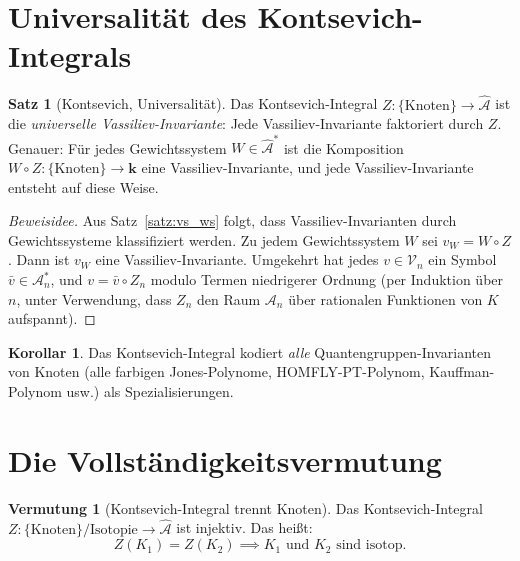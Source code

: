 \documentclass[12pt,a4paper]{amsart}
\theoremstyle{definition}
\newtheorem{satz}[theorem]{Satz}
\newtheorem{vermutung}[theorem]{Vermutung}
\newtheorem{korollar}[theorem]{Korollar}
\newcommand{\Ac}{\mathcal{A}}
\begin{document}
\section{Universalität des Kontsevich-Integrals}\label{sec:universalitaet}

\begin{satz}[Kontsevich, Universalität]\label{satz:universalitaet}
Das Kontsevich-Integral $Z: \{\text{Knoten}\} \to \hat{\mathcal{A}}$ ist
die \emph{universelle Vassiliev-Invariante}: Jede Vassiliev-Invariante
faktoriert durch $Z$.  Genauer: Für jedes Gewichtssystem $W \in \hat{\mathcal{A}}^*$
ist die Komposition $W \circ Z: \{\text{Knoten}\} \to \mathbf{k}$ eine
Vassiliev-Invariante, und jede Vassiliev-Invariante entsteht auf diese Weise.
\end{satz}

\begin{proof}[Beweisidee]
Aus Satz~\ref{satz:vs_ws} folgt, dass Vassiliev-Invarianten durch
Gewichtssysteme klassifiziert werden.  Zu jedem Gewichtssystem $W$ sei
$v_W = W \circ Z$.  Dann ist $v_W$ eine Vassiliev-Invariante.  Umgekehrt
hat jedes $v \in \mathcal{V}_n$ ein Symbol $\bar{v} \in \Ac_n^*$, und
$v = \bar{v} \circ Z_n$ modulo Termen niedrigerer Ordnung (per Induktion
über $n$, unter Verwendung, dass $Z_n$ den Raum $\Ac_n$ über rationalen
Funktionen von $K$ aufspannt).
\end{proof}

\begin{korollar}
Das Kontsevich-Integral kodiert \emph{alle} Quantengruppen-Invarianten
von Knoten (alle farbigen Jones-Polynome, HOMFLY-PT-Polynom,
Kauffman-Polynom usw.) als Spezialisierungen.
\end{korollar}

\section{Die Vollständigkeitsvermutung}\label{sec:vollstaendigkeit}

\begin{vermutung}[Kontsevich-Integral trennt Knoten]\label{verm:vollstaendig}
Das Kontsevich-Integral $Z: \{\text{Knoten}\} / \text{Isotopie} \to \hat{\mathcal{A}}$
ist injektiv.  Das heißt:
\[
  Z(K_1) = Z(K_2) \implies K_1 \text{ und } K_2 \text{ sind isotop.}
\]
\end{vermutung}
\end{document}
